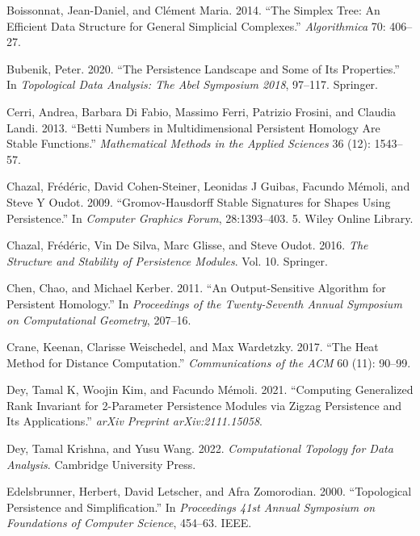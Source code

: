 \documentclass[
  letterpaper,
  DIV=11,
  numbers=noendperiod,
  oneside]{scrartcl}
\begin{document}
\begin{CSLReferences}
Boissonnat, Jean-Daniel, and Clément Maria. 2014. {``The Simplex Tree:
An Efficient Data Structure for General Simplicial Complexes.''}
\emph{Algorithmica} 70: 406--27.

Bubenik, Peter. 2020. {``The Persistence Landscape and Some of Its
Properties.''} In \emph{Topological Data Analysis: The Abel Symposium
2018}, 97--117. Springer.

Cerri, Andrea, Barbara Di Fabio, Massimo Ferri, Patrizio Frosini, and
Claudia Landi. 2013. {``Betti Numbers in Multidimensional Persistent
Homology Are Stable Functions.''} \emph{Mathematical Methods in the
Applied Sciences} 36 (12): 1543--57.

Chazal, Frédéric, David Cohen-Steiner, Leonidas J Guibas, Facundo
Mémoli, and Steve Y Oudot. 2009. {``Gromov-Hausdorff Stable Signatures
for Shapes Using Persistence.''} In \emph{Computer Graphics Forum},
28:1393--403. 5. Wiley Online Library.

Chazal, Frédéric, Vin De Silva, Marc Glisse, and Steve Oudot. 2016.
\emph{The Structure and Stability of Persistence Modules}. Vol. 10.
Springer.

Chen, Chao, and Michael Kerber. 2011. {``An Output-Sensitive Algorithm
for Persistent Homology.''} In \emph{Proceedings of the Twenty-Seventh
Annual Symposium on Computational Geometry}, 207--16.

Crane, Keenan, Clarisse Weischedel, and Max Wardetzky. 2017. {``The Heat
Method for Distance Computation.''} \emph{Communications of the ACM} 60
(11): 90--99.

Dey, Tamal K, Woojin Kim, and Facundo Mémoli. 2021. {``Computing
Generalized Rank Invariant for 2-Parameter Persistence Modules via
Zigzag Persistence and Its Applications.''} \emph{arXiv Preprint
arXiv:2111.15058}.

Dey, Tamal Krishna, and Yusu Wang. 2022. \emph{Computational Topology
for Data Analysis}. Cambridge University Press.

Edelsbrunner, Herbert, David Letscher, and Afra Zomorodian. 2000.
{``Topological Persistence and Simplification.''} In \emph{Proceedings
41st Annual Symposium on Foundations of Computer Science}, 454--63.
IEEE.


\end{CSLReferences}
\end{document}
